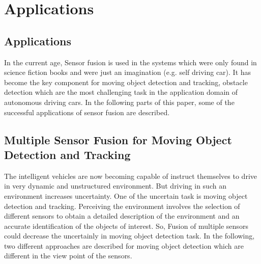 \chapter{Applications}

\section{Applications}
In the current age, Sensor fusion is used in the systems which were only found in science fiction books and were just an imagination (e.g. self driving car). It has become the key component for moving object detection and tracking\cite{Cho_2014, Chavez_Garcia_2016}, obstacle detection\cite{Shinzato_2014} which are the most challenging task in the application domain of autonomous driving cars. In the following parts of this paper, some of the successful applications of sensor fusion are described.


\section{Multiple Sensor Fusion for Moving Object Detection and Tracking}
The intelligent vehicles are now becoming capable of instruct themselves to drive in very dynamic and unstructured environment. But driving in such an environment increases uncertainty. One of the uncertain task is moving object detection and tracking. Perceiving the environment involves the selection of different sensors to obtain a detailed description of the environment and an accurate identification of the objects of interest\cite{Chavez_Garcia_2016}. So, Fusion of multiple sensors could decrease the uncertainly in moving object detection task. In the following, two different approaches are described for moving object detection which are different in the view point of the sensors.

